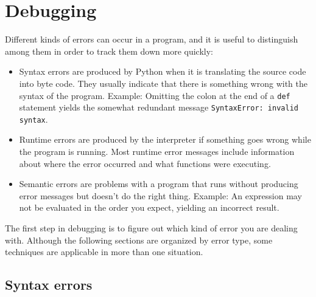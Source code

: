 \documentclass[10pt]{book}
\begin{document}
\begin{ex}
\begin{enumerate}
\end{enumerate}

\end{ex}



% 

\appendix

\chapter{Debugging}

Different kinds of errors can occur
in a program, and it is useful to distinguish among them
in order to track them down more quickly:

\begin{itemize}

\item Syntax errors are produced by Python when it is translating the
  source code into byte code.  They usually indicate that there is
  something wrong with the syntax of the program.  Example: Omitting
  the colon at the end of a {\tt def} statement yields the somewhat
  redundant message {\tt SyntaxError: invalid syntax}.

\item Runtime errors are produced by the interpreter if something goes
  wrong while the program is running.  Most runtime error messages
  include information about where the error occurred and what
  functions were executing.  

\item Semantic errors are problems with a program that runs without
  producing error messages but doesn't do the right thing.  Example:
  An expression may not be evaluated in the order you expect, yielding
  an incorrect result.

\end{itemize}


The first step in debugging is to figure out which kind of
error you are dealing with.  Although the following sections are
organized by error type, some techniques are
applicable in more than one situation.


\section{Syntax errors}
\end{document}
